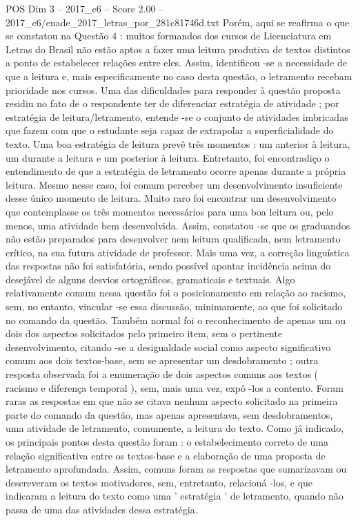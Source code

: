 \begin{textsample}{POS Dim 3 – 2017\_c6 – Score 2.00 – 2017\_c6/enade\_2017\_letras\_por\_281c81746d.txt}
Porém, aqui se reafirma o que se constatou na Questão 4 : muitos formandos dos cursos de Licenciatura em Letras do Brasil não estão aptos a fazer uma leitura produtiva de textos distintos a ponto de estabelecer relações entre eles.
Assim, identificou -se a necessidade de que a leitura e, mais especificamente no caso desta questão, o letramento recebam prioridade nos cursos.
Uma das dificuldades para responder à questão proposta residiu no fato de o respondente ter de diferenciar estratégia de atividade ; por estratégia de leitura/letramento, entende -se o conjunto de atividades imbricadas que fazem com que o estudante seja capaz de extrapolar a superficialidade do texto.
Uma boa estratégia de leitura prevê três momentos : um anterior à leitura, um durante a leitura e um posterior à leitura.
Entretanto, foi encontradiço o entendimento de que a estratégia de letramento ocorre apenas durante a própria leitura.
Mesmo nesse caso, foi comum perceber um desenvolvimento insuficiente desse único momento de leitura.
Muito raro foi encontrar um desenvolvimento que contemplasse os três momentos necessários para uma boa leitura ou, pelo menos, uma atividade bem desenvolvida.
Assim, constatou -se que os graduandos não estão preparados para desenvolver nem leitura qualificada, nem letramento crítico, na sua futura atividade de professor.
Mais uma vez, a correção linguística das respostas não foi satisfatória, sendo possível apontar incidência acima do desejável de alguns desvios ortográficos, gramaticais e textuais.
Algo relativamente comum nessa questão foi o posicionamento em relação ao racismo, sem, no entanto, vincular -se essa discussão, minimamente, ao que foi solicitado no comando da questão.
Também normal foi o reconhecimento de apenas um ou dois dos aspectos solicitados pelo primeiro item, sem o pertinente desenvolvimento, citando -se a desigualdade social como aspecto significativo comum aos dois textos-base, sem se apresentar um desdobramento ; outra resposta observada foi a enumeração de dois aspectos comuns aos textos ( racismo e diferença temporal ), sem, mais uma vez, expô -los a contento.
Foram raras as respostas em que não se citava nenhum aspecto solicitado na primeira parte do comando da questão, mas apenas apresentava, sem desdobramentos, uma atividade de letramento, comumente, a leitura do texto.
Como já indicado, os principais pontos desta questão foram : o estabelecimento correto de uma relação significativa entre os textos-base e a elaboração de uma proposta de letramento aprofundada.
Assim, comuns foram as respostas que sumarizavam ou descreveram os textos motivadores, sem, entretanto, relacioná -los, e que indicaram a leitura do texto como uma ' estratégia ' de letramento, quando não passa de uma das atividades dessa estratégia.

\end{textsample}
